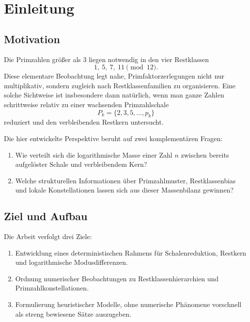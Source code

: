 \documentclass[11pt,a4paper]{article}
\theoremstyle{plain}
\theoremstyle{definition}
\theoremstyle{remark}
\newcommand{\1}{\mathbf{1}}
\begin{document}
	\tableofcontents
	
	\section{Einleitung}
	
	\subsection{Motivation}
	
	Die Primzahlen größer als \(3\) liegen notwendig in den vier Restklassen
	\[
	1,\ 5,\ 7,\ 11 \pmod{12}.
	\]
	Diese elementare Beobachtung legt nahe, Primfaktorzerlegungen nicht nur multiplikativ, sondern zugleich nach Restklassenfamilien zu organisieren. Eine solche Sichtweise ist insbesondere dann natürlich, wenn man ganze Zahlen schrittweise relativ zu einer wachsenden Primzahlschale
	\[
	P_k=\{2,3,5,\dots,p_k\}
	\]
	reduziert und den verbleibenden Restkern untersucht.
	
	Die hier entwickelte Perspektive beruht auf zwei komplementären Fragen:
	\begin{enumerate}[label=(\arabic*)]
		\item Wie verteilt sich die logarithmische Masse einer Zahl \(n\) zwischen bereits aufgelöster Schale und verbleibendem Kern?
		\item Welche strukturellen Informationen über Primzahlmuster, Restklassenbias und lokale Konstellationen lassen sich aus dieser Massenbilanz gewinnen?
	\end{enumerate}
	
	\subsection{Ziel und Aufbau}
	
	Die Arbeit verfolgt drei Ziele:
	\begin{enumerate}[label=(\roman*)]
		\item Entwicklung eines deterministischen Rahmens für Schalenreduktion, Restkern und logarithmische Modusdifferenzen.
		\item Ordnung numerischer Beobachtungen zu Restklassenhierarchien und Primzahlkonstellationen.
		\item Formulierung heuristischer Modelle, ohne numerische Phänomene vorschnell als streng bewiesene Sätze auszugeben.
	\end{enumerate}
	
\end{document}
